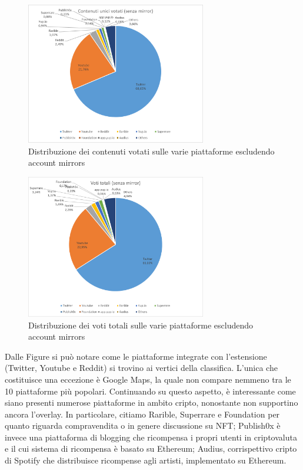 \begin{figure}[t]
    \centering
    \includegraphics[width=0.7\textwidth]{graphs/platforms_unici_nomirr.png}
    \caption{Distribuzione dei contenuti votati sulle varie piattaforme escludendo account mirrors}
    \label{fig: platformsunique_nomirr}
\end{figure}    
\begin{figure}[t]  
    \centering
    \includegraphics[width=0.7\textwidth]{graphs/platforms_tot_nomirr.png}
    \caption{Distribuzione dei voti totali sulle varie piattaforme escludendo account mirrors}
    \label{fig: platformstot_nomirr}
\end{figure}
%

Dalle Figure si può notare come le piattaforme integrate con l'estensione (Twitter, Youtube e Reddit) si trovino ai vertici della classifica. L'unica che costituisce una eccezione è Google Maps, la quale non compare nemmeno tra le 10 piattaforme più popolari. Continuando su questo aspetto, è interessante come siano presenti numerose piattaforme in ambito cripto, nonostante non supportino ancora l'overlay. In particolare, citiamo Rarible, Superrare e Foundation per quanto riguarda compravendita o in genere discussione su NFT; Publish0x è invece una piattaforma di blogging che ricompensa i propri utenti in criptovaluta e il cui sistema di ricompensa è basato su Ethereum; Audius, corrispettivo cripto di Spotify che distribuisce ricompense agli artisti, implementato su Ethereum.


